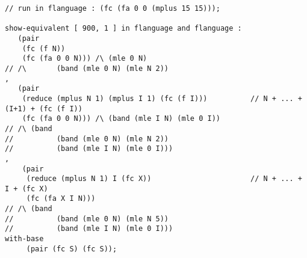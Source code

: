 \documentclass[10pt,a5paper]{article}
\begin{document}
\begin{verbatim}
// run in flanguage : (fc (fa 0 0 (mplus 15 15)));

show-equivalent [ 900, 1 ] in flanguage and flanguage :
   (pair
    (fc (f N))
    (fc (fa 0 0 N))) /\ (mle 0 N)
// /\       (band (mle 0 N) (mle N 2))
,
   (pair
    (reduce (mplus N 1) (mplus I 1) (fc (f I)))          // N + ... + (I+1) + (fc (f I))
    (fc (fa 0 0 N))) /\ (band (mle I N) (mle 0 I))
// /\ (band
//          (band (mle 0 N) (mle N 2))
//          (band (mle I N) (mle 0 I)))
,
    (pair
     (reduce (mplus N 1) I (fc X))                       // N + ... + I + (fc X)
     (fc (fa X I N)))
// /\ (band
//          (band (mle 0 N) (mle N 5))
//          (band (mle I N) (mle 0 I)))
with-base
     (pair (fc S) (fc S));
\end{verbatim}

   
\end{document}
